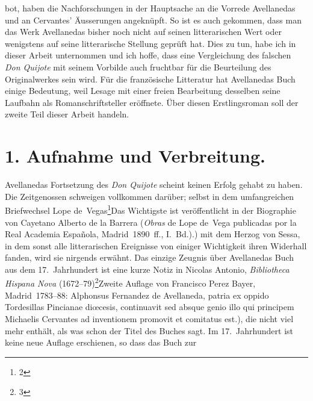 bot, haben die Nachforschungen in der Hauptsache an die Vorrede
Avellanedas und an Cervantes' Äusserungen angeknüpft. So ist es auch
gekommen, dass man das Werk Avellanedas bisher noch nicht auf
seinen litterarischen Wert oder wenigstens auf seine litterarische Stellung
geprüft hat. Dies zu tun, habe ich in dieser Arbeit unternommen und
ich hoffe, dass eine Vergleichung des falschen {\it Don Quijote} mit seinem
Vorbilde auch fruchtbar für die Beurteilung des Originalwerkes sein
wird. Für die französische Litteratur hat Avellanedas Buch einige
Bedeutung, weil Lesage mit einer freien Bearbeitung desselben seine
Laufbahn als Romanschriftsteller eröffnete. Über diesen Erstlingsroman soll
der zweite Teil dieser Arbeit handeln.

\section{1. Aufnahme und Verbreitung.}

Avellanedas Fortsetzung des {\it Don Quijote} scheint keinen Erfolg
gehabt zu haben. Die Zeitgenossen schweigen vollkommen darüber;
selbst in dem umfangreichen Briefwechsel Lope de~Vegas\footnote{2}{Das
Wichtigste ist veröffentlicht in der Biographie von Cayetano Alberto
de la Barrera ({\it Obras} de Lope de~Vega publicadas por la Real Academia Española,
Madrid~1890~ff., I.~Bd.).}) mit dem
Herzog von Sessa, in dem sonst alle litterarischen Ereignisse von einiger
Wichtigkeit ihren Widerhall fanden, wird sie nirgends erwähnt. Das
einzige Zeugnis über Avellanedas Buch aus dem 17.~Jahrhundert ist eine
kurze Notiz in Nicolas Antonio, {\it Bibliotheca Hispana Nova}
(1672--79)\footnote{3}{Zweite Auflage von Francisco Perez Bayer,
Madrid~1783--88: {\itquoted Alphonsus Fernandez de Avellaneda,
patria ex oppido Tordesillas Pincianae diœcesis, continuavit
sed absque genio illo qui principem Michaelis Cervantes ad inventionem
promovit et comitatus est.}}),
die nicht viel mehr enthält, als was schon der Titel des Buches sagt.
Im 17.~Jahrhundert ist keine neue Auflage erschienen, so dass das Buch zur



